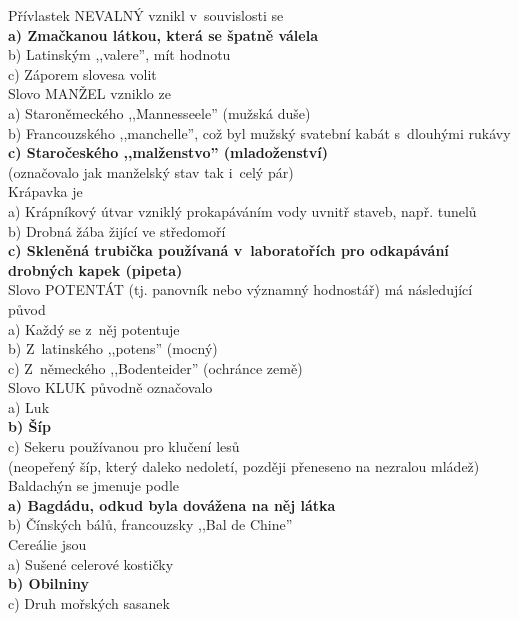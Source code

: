 \begin{multicols}{\value{columnsthindata}}
\noindent
Přívlastek NEVALNÝ vznikl v~souvislosti se\\
\textbf{a) Zmačkanou látkou, která se špatně válela}\\
b) Latinským ,,valere'', mít hodnotu\\
c) Záporem slovesa volit\\

\noindent
Slovo MANŽEL vzniklo ze\\
a) Staroněmeckého ,,Mannesseele'' (mužská duše)\\
b) Francouzského ,,manchelle'', což byl mužský svatební kabát 
s~dlouhými rukávy\\
\textbf{c) Staročeského ,,malženstvo'' (mladoženství)}\\
(označovalo jak manželský stav tak i~celý pár)\\

\noindent
Krápavka je \\
a) Krápníkový útvar vzniklý prokapáváním vody uvnitř staveb, 
např. tunelů\\
b) Drobná žába žijící ve středomoří\\
\textbf{c) Skleněná trubička používaná v~laboratořích pro 
odkapávání drobných kapek (pipeta)}\\

\noindent
Slovo POTENTÁT (tj. panovník nebo významný hodnostář) má následující 
původ\\
a) Každý se z~něj potentuje\\
b) Z~latinského ,,potens'' (mocný)\\
c) Z~německého ,,Bodenteider'' (ochránce země)\\

\noindent
Slovo KLUK původně označovalo\\
a) Luk\\
\textbf{b) Šíp}\\
c) Sekeru používanou pro klučení lesů\\
(neopeřený šíp, který daleko nedoletí, později přeneseno na nezralou 
mládež)\\

\noindent
Baldachýn se jmenuje podle\\
\textbf{a) Bagdádu, odkud byla dovážena na něj látka}\\
b) Čínských bálů, francouzsky ,,Bal de Chine''\\

\noindent
Cereálie jsou\\
a) Sušené celerové kostičky\\
\textbf{b) Obilniny}\\
c) Druh mořských sasanek\\


\end{multicols}
